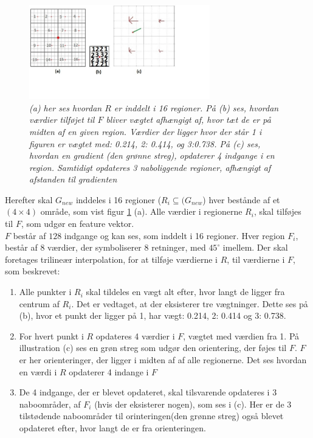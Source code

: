 \begin{figure}[H]
    \centering
    \includegraphics[width=0.70\textwidth]{fig/tilsift.jpg}
     \vspace{-1em}
    \begin{center}    
       \caption{{\footnotesize \textit{(a) her ses hvordan $R$ er inddelt i 16 regioner. På (b) ses, hvordan værdier tilføjet til $F$ bliver vægtet afhængigt af, hvor tæt de er på midten af en given region. Værdier der ligger hvor der står 1 i figuren er vægtet med: 0.214, 2: 0.414, og 3:0.738. På (c) ses, hvordan en gradient (den grønne streg), opdaterer 4 indgange i en region. Samtidigt opdateres 3 naboliggende regioner, afhængigt af afstanden til gradienten}}}
    \label{trilinear}
     \end{center}
     \vspace{-2.5em}
  \end{figure} \noindent
Herefter skal $G_{new}$ inddeles i 16 regioner ($R_{i} \subseteq (G_{new}$) hver bestånde af et $(4\times 4)$ område, som vist figur \ref{trilinear} (a). Alle værdier i regionerne $R_i$, skal tilføjes til $F$, som udgør en feature vektor.
\\
$F$ består af $128$ indgange og kan ses, som inddelt i 16 regioner. Hver region $F_i$, består af 8 værdier, der symboliserer 8 retninger, med $45^\circ$ imellem. Der skal foretages trilineær interpolation, for at tilføje værdierne i $R$, til værdierne i $F$, som beskrevet:
\begin{enumerate}
\item{Alle punkter i $R_{i}$ skal tildeles en vægt alt efter, hvor langt de ligger fra centrum af $R_{i}$. Det er vedtaget, at der eksisterer tre vægtninger. Dette ses på (b), hvor et punkt der ligger på  1, har vægt: 0.214, 2: 0.414 og 3: 0.738.}
\item{For hvert punkt i $R$ opdateres 4 værdier i $F$, vægtet med værdien fra 1. På illustration (c) ses en grøn streg som udgør den orientering, der føjes til $F$. $F$ er her orienteringer, der ligger i midten af af alle regionerne. Det ses hvordan en værdi i $R$ opdaterer 4 indange i $F$}
\item{De 4 indgange, der er blevet opdateret, skal tilsvarende opdateres i 3 naboområder, af $F_i$ (hvis der eksisterer nogen), som ses i (c). Her er de 3 tilstødende naboområder til orinteringen(den grønne streg) også blevet opdateret efter, hvor langt de er fra orienteringen.}
\end{enumerate}

